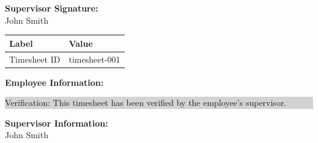 \documentclass{article}
\begin{document}
\noindent
{\Large \textbf{Supervisor Signature:}} \\
John Smith \\
\vspace{-1cm}

\noindent
\begin{tabularx}{\textwidth}{|l|X|}
\hline
\textbf{Label} & \textbf{Value} \\
\hline
Timesheet ID & timesheet-001 \\
\hline
\end{tabularx}

\vspace{1cm}

\noindent
{\Large \textbf{Employee Information:}}
\vspace{-0.5cm}
{\colorbox{lightgray}{%
\begin{minipage}[t]{0.4\textwidth}
\raggedright
Verification: This timesheet has been verified by the employee's supervisor.
\end{minipage}%
}}

\noindent
{\Large \textbf{Supervisor Information:}} \\
John Smith \\
\vspace{-1cm}
\end{document}
